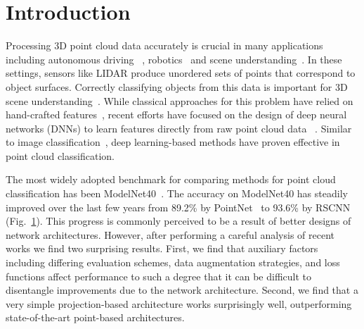 \documentclass{article}
\begin{document}
\section{Introduction}
\begin{figure}[t]
  \centering
  \label{fig:accuracies}
\end{figure}
Processing 3D point cloud data accurately is crucial in many applications including autonomous driving ~\citep{navarro2010pedestrian,kidono2011pedestrian}, robotics~\citep{rusu2009close, correll2016analysis,mousavian20196} and scene understanding~\cite{aldoma2012tutorial}. In these settings, sensors like LIDAR produce unordered sets of points that correspond to object surfaces. Correctly classifying objects from this data is important for 3D scene understanding~\citep{uy2019revisiting}. While classical approaches for this problem have relied on hand-crafted features~\citep{arras2007using}, recent efforts have focused on the design of deep neural networks (DNNs) to learn features directly from raw point cloud data ~\citep{qi-pointnet-cvpr17}. Similar to image classification~\cite{yalniz2019billion,dosovitskiy2020image,szegedy2016rethinking}, deep learning-based methods have proven effective in point cloud classification.

The most widely adopted benchmark for comparing methods for point cloud classification has been ModelNet40~\citep{wu20153d}. The accuracy on ModelNet40 has steadily improved over the last few years from 89.2\% by PointNet~\citep{qi-pointnet-cvpr17} to 93.6\% by RSCNN~\citep{liu2019relation} (Fig.~\ref{fig:accuracies}). This progress is commonly perceived to be a result of better designs of network architectures. However, after performing a careful analysis of recent works we find two surprising results. First, we find that auxiliary factors including differing evaluation schemes, data augmentation strategies, and loss functions affect performance to such a degree that it can be difficult to disentangle improvements due to the network architecture. Second, we find that a very simple projection-based architecture works surprisingly well, outperforming state-of-the-art point-based architectures.
\end{document}
